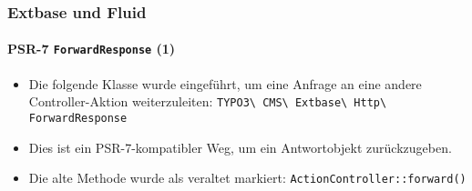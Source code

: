 %

\begin{frame}[fragile]
	\frametitle{Extbase und Fluid}
	\framesubtitle{PSR-7 \texttt{ForwardResponse} (1)}

	\begin{itemize}
		\item Die folgende Klasse wurde eingeführt, um eine Anfrage an eine andere 
			Controller-Aktion weiterzuleiten:
			\smaller\texttt{TYPO3\textbackslash
				CMS\textbackslash
				Extbase\textbackslash
				Http\textbackslash
				ForwardResponse}\normalsize
		\item Dies ist ein PSR-7-kompatibler Weg, um ein Antwortobjekt zurückzugeben.
		\item Die alte Methode wurde als veraltet markiert:\newline
			\smaller\texttt{ActionController::forward()}\normalsize

	\end{itemize}

\end{frame}

